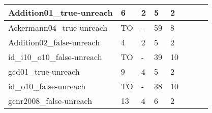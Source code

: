 \begin{table}
{\begin{tabular}{|l|l|l|l|l|l|l|}
    Addition01\_true-unreach                                 & 6                                     & 2                                          & 5                                     & 2                                          & ~                                                               & ~                                        \\ \hline
    Ackermann04\_true-unreach                                & TO                                    & -                                          & 59                                    & 8                                          & ~                                                               & ~                                        \\ \hline
    Addition02\_false-unreach                                & 4                                     & 2                                          & 5                                     & 2                                          & ~                                                               & ~                                        \\ \hline
    id\_i10\_o10\_false-unreach                              & TO                                    & -                                          & 39                                    & 10                                         & ~                                                               & ~                                        \\ \hline
    gcd01\_true-unreach                                      & 9                                     & 4                                          & 5                                     & 2                                          & ~                                                               & ~                                        \\ \hline
    id\_o10\_false-unreach                                   & TO                                    & -                                          & 38                                    & 10                                         & ~                                                               & ~                                        \\ \hline
    gcnr2008\_false-unreach                                  & 13                                    & 4                                          & 6                                     & 2                                          & ~                                                               & ~                                        \\ \hline

\end{tabular}}
\end{table}
